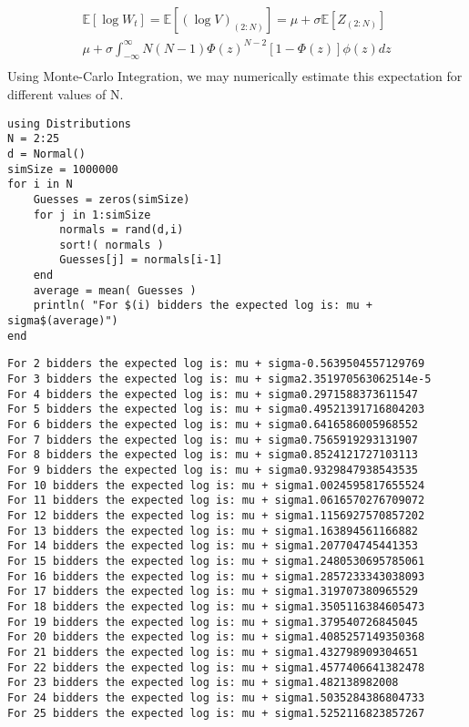 \documentclass[10pt]{paper}
\begin{document}
\begin{align*}
  \mathbb{E}[\log{W_t}] = \mathbb{E}[ (\log{V})_{(2:N)} ] = \mu + \sigma \mathbb{E}[Z_{(2:N)}]\\
  \mu + \sigma \int_{-\infty}^\infty N(N-1) \Phi(z)^{N-2}[ 1 - \Phi(z) ] \phi(z) dz\\
\end{align*}
Using Monte-Carlo Integration, we may numerically estimate this
expectation for different values of N.
\begin{verbatim}
using Distributions
N = 2:25
d = Normal()
simSize = 1000000
for i in N
    Guesses = zeros(simSize)
    for j in 1:simSize
        normals = rand(d,i)
        sort!( normals )
        Guesses[j] = normals[i-1]
    end
    average = mean( Guesses )
    println( "For $(i) bidders the expected log is: mu + sigma$(average)")
end
\end{verbatim}
\begin{verbatim}
For 2 bidders the expected log is: mu + sigma-0.5639504557129769
For 3 bidders the expected log is: mu + sigma2.351970563062514e-5
For 4 bidders the expected log is: mu + sigma0.2971588373611547
For 5 bidders the expected log is: mu + sigma0.49521391716804203
For 6 bidders the expected log is: mu + sigma0.6416586005968552
For 7 bidders the expected log is: mu + sigma0.7565919293131907
For 8 bidders the expected log is: mu + sigma0.8524121727103113
For 9 bidders the expected log is: mu + sigma0.9329847938543535
For 10 bidders the expected log is: mu + sigma1.0024595817655524
For 11 bidders the expected log is: mu + sigma1.0616570276709072
For 12 bidders the expected log is: mu + sigma1.1156927570857202
For 13 bidders the expected log is: mu + sigma1.163894561166882
For 14 bidders the expected log is: mu + sigma1.207704745441353
For 15 bidders the expected log is: mu + sigma1.2480530695785061
For 16 bidders the expected log is: mu + sigma1.2857233343038093
For 17 bidders the expected log is: mu + sigma1.319707380965529
For 18 bidders the expected log is: mu + sigma1.3505116384605473
For 19 bidders the expected log is: mu + sigma1.379540726845045
For 20 bidders the expected log is: mu + sigma1.4085257149350368
For 21 bidders the expected log is: mu + sigma1.432798909304651
For 22 bidders the expected log is: mu + sigma1.4577406641382478
For 23 bidders the expected log is: mu + sigma1.482138982008
For 24 bidders the expected log is: mu + sigma1.5035284386804733
For 25 bidders the expected log is: mu + sigma1.5252116823857267
\end{verbatim}
\end{document}
